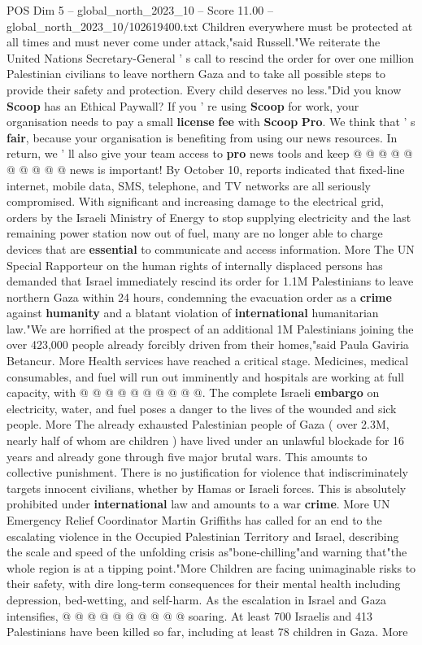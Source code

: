 \begin{textsample}{POS Dim 5 – global\_north\_2023\_10 – Score 11.00 – global\_north\_2023\_10/102619400.txt}
Children everywhere must be protected at all times and must never come under attack,"said Russell."We reiterate the United Nations Secretary-General ' s call to rescind the order for over one million Palestinian civilians to leave northern Gaza and to take all possible steps to provide their safety and protection.
Every child deserves no less."Did you know \textbf{Scoop} has an Ethical Paywall?
If you ' re using \textbf{Scoop} for work, your organisation needs to pay a small \textbf{license} \textbf{fee} with \textbf{Scoop} \textbf{Pro}.
We think that ' s \textbf{fair}, because your organisation is benefiting from using our news resources.
In return, we ' ll also give your team access to \textbf{pro} news tools and keep @ @ @ @ @ @ @ @ @ @ news is important!
By October 10, reports indicated that fixed-line internet, mobile data, SMS, telephone, and TV networks are all seriously compromised.
With significant and increasing damage to the electrical grid, orders by the Israeli Ministry of Energy to stop supplying electricity and the last remaining power station now out of fuel, many are no longer able to charge devices that are \textbf{essential} to communicate and access information.
More The UN Special Rapporteur on the human rights of internally displaced persons has demanded that Israel immediately rescind its order for 1.1M Palestinians to leave northern Gaza within 24 hours, condemning the evacuation order as a \textbf{crime} against \textbf{humanity} and a blatant violation of \textbf{international} humanitarian law."We are horrified at the prospect of an additional 1M Palestinians joining the over 423,000 people already forcibly driven from their homes,"said Paula Gaviria Betancur.
More Health services have reached a critical stage.
Medicines, medical consumables, and fuel will run out imminently and hospitals are working at full capacity, with @ @ @ @ @ @ @ @ @ @.
The complete Israeli \textbf{embargo} on electricity, water, and fuel poses a danger to the lives of the wounded and sick people.
More The already exhausted Palestinian people of Gaza ( over 2.3M, nearly half of whom are children ) have lived under an unlawful blockade for 16 years and already gone through five major brutal wars.
This amounts to collective punishment.
There is no justification for violence that indiscriminately targets innocent civilians, whether by Hamas or Israeli forces.
This is absolutely prohibited under \textbf{international} law and amounts to a war \textbf{crime}.
More UN Emergency Relief Coordinator Martin Griffiths has called for an end to the escalating violence in the Occupied Palestinian Territory and Israel, describing the scale and speed of the unfolding crisis as"bone-chilling"and warning that"the whole region is at a tipping point."More Children are facing unimaginable risks to their safety, with dire long-term consequences for their mental health including depression, bed-wetting, and self-harm.
As the escalation in Israel and Gaza intensifies, @ @ @ @ @ @ @ @ @ @ soaring.
At least 700 Israelis and 413 Palestinians have been killed so far, including at least 78 children in Gaza.
More


\end{textsample}
